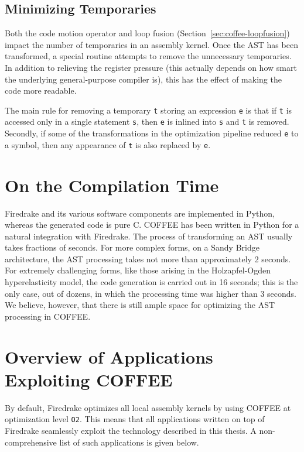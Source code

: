 \subsection{Minimizing Temporaries}
Both the code motion operator and loop fusion (Section~\ref{sec:coffee-loopfusion}) impact the number of temporaries in an assembly kernel. Once the AST has been transformed, a special routine attempts to remove the unnecessary temporaries. In addition to relieving the register pressure (this actually depends on how smart the underlying general-purpose compiler is), this has the effect of making the code more readable.

The main rule for removing a temporary \texttt{t} storing an expression \texttt{e} is that if \texttt{t} is accessed only in a single statement \texttt{s}, then \texttt{e} is inlined into \texttt{s} and \texttt{t} is removed. Secondly, if some of the transformations in the optimization pipeline reduced \texttt{e} to a symbol, then any appearance of \texttt{t} is also replaced by \texttt{e}.

\section{On the Compilation Time}
Firedrake and its various software components are implemented in Python, whereas the generated code is pure C. COFFEE has been written in Python for a natural integration with Firedrake. The process of transforming an AST usually takes fractions of seconds. For more complex forms, on a Sandy Bridge architecture, the AST processing takes not more than approximately 2 seconds. For extremely challenging forms, like those arising in the Holzapfel-Ogden hyperelasticity model, the code generation is carried out in 16 seconds; this is the only case, out of dozens, in which the processing time was higher than 3 seconds. We believe, however, that there is still ample space for optimizing the AST processing in COFFEE.

\section{Overview of Applications Exploiting COFFEE}
By default, Firedrake optimizes all local assembly kernels by using COFFEE at optimization level \texttt{O2}. This means that all applications written on top of Firedrake seamlessly exploit the technology described in this thesis. A non-comprehensive list of such applications is given below.

